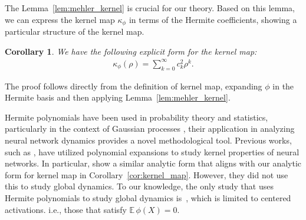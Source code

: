 \documentclass[twoside]{article}
\newcommand{\km}{\kappa_\phi}
\newcommand{\E}{\mathbb{E}\,}
\newtheorem{corollary}{Corollary}
\theoremstyle{definition}
\newcommand{\thomas}[1]{{\color{blue}\textit{#1}}}
\begin{document}
The Lemma~\ref{lem:mehler_kernel} is crucial for our theory. Based on this lemma, we can express the kernel map $\km$ in terms of the Hermite coefficients, showing a particular structure of the kernel map.

\begin{corollary}
    \label{cor:hermite_covariance}
    \label{cor:kernel_map}
We have the following explicit form for the kernel map:
\begin{align*}
\km(\rho) = \sum_{k=0}^\infty c_k^2 \rho^k.
\end{align*}
\end{corollary}

The proof follows directly from the definition of kernel map, expanding $\phi$ in the Hermite basis and then applying Lemma~\ref{lem:mehler_kernel}. 

Hermite polynomials have been used in probability theory and statistics, particularly in the context of Gaussian processes \citep{williams2006gaussian}, their application in analyzing neural network dynamics provides a novel methodological tool. Previous works, such as \citet{daniely2016toward}, have utilized polynomial expansions to study kernel properties of neural networks. In particular, 
\citet{daniely2016toward} show a similar analytic form that aligns with our analytic form for kernel map in Corollary~\ref{cor:kernel_map}. However, they did not use this to study global dynamics. To our knowledge, the only study that uses Hermite polynomials to study global dynamics is~\citep{joudaki2023impact}, which is limited to centered activations. i.e., those that satisfy $\E \phi(X)=0.$ 


\end{document}
